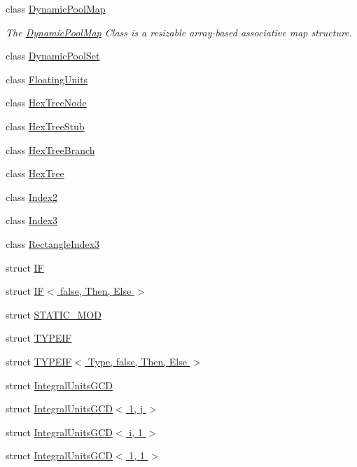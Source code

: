 \begin{CompactItemize}
class \hyperlink{class_j_g_t_l_1_1_dynamic_pool_map}{Dynamic\-Pool\-Map}
\begin{CompactList}\small\item\em The \hyperlink{class_j_g_t_l_1_1_dynamic_pool_map}{Dynamic\-Pool\-Map} Class is a resizable array-based associative map structure. \item\end{CompactList}\item 
class \hyperlink{class_j_g_t_l_1_1_dynamic_pool_set}{Dynamic\-Pool\-Set}
\item 
class \hyperlink{class_j_g_t_l_1_1_floating_units}{Floating\-Units}
\item 
class \hyperlink{class_j_g_t_l_1_1_hex_tree_node}{Hex\-Tree\-Node}
\item 
class \hyperlink{class_j_g_t_l_1_1_hex_tree_stub}{Hex\-Tree\-Stub}
\item 
class \hyperlink{class_j_g_t_l_1_1_hex_tree_branch}{Hex\-Tree\-Branch}
\item 
class \hyperlink{class_j_g_t_l_1_1_hex_tree}{Hex\-Tree}
\item 
class \hyperlink{class_j_g_t_l_1_1_index2}{Index2}
\item 
class \hyperlink{class_j_g_t_l_1_1_index3}{Index3}
\item 
class \hyperlink{class_j_g_t_l_1_1_rectangle_index3}{Rectangle\-Index3}
\item 
struct \hyperlink{struct_j_g_t_l_1_1_i_f}{IF}
\item 
struct \hyperlink{struct_j_g_t_l_1_1_i_f_3_01false_00_01_then_00_01_else_01_4}{IF$<$ false, Then, Else $>$}
\item 
struct \hyperlink{struct_j_g_t_l_1_1_s_t_a_t_i_c___m_o_d}{STATIC\_\-MOD}
\item 
struct \hyperlink{struct_j_g_t_l_1_1_t_y_p_e_i_f}{TYPEIF}
\item 
struct \hyperlink{struct_j_g_t_l_1_1_t_y_p_e_i_f_3_01_type_00_01false_00_01_then_00_01_else_01_4}{TYPEIF$<$ Type, false, Then, Else $>$}
\item 
struct \hyperlink{struct_j_g_t_l_1_1_integral_units_g_c_d}{Integral\-Units\-GCD}
\item 
struct \hyperlink{struct_j_g_t_l_1_1_integral_units_g_c_d_3_011_00_01j_01_4}{Integral\-Units\-GCD$<$ 1, j $>$}
\item 
struct \hyperlink{struct_j_g_t_l_1_1_integral_units_g_c_d_3_01i_00_011_01_4}{Integral\-Units\-GCD$<$ i, 1 $>$}
\item 
struct \hyperlink{struct_j_g_t_l_1_1_integral_units_g_c_d_3_011_00_011_01_4}{Integral\-Units\-GCD$<$ 1, 1 $>$}

\end{CompactItemize}

